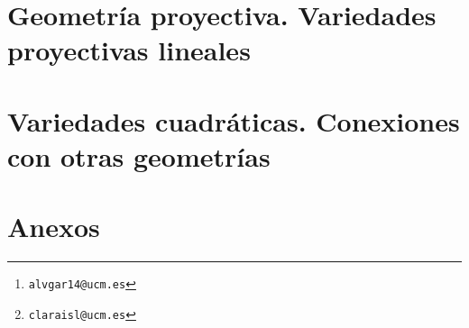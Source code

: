 \documentclass[a4paper, 10pt, twoside, titlepage, openright, onecolumn, final]{book}
\title{\tb{Geometría Lineal}}
\author{Álvaro García Tenorio
	\thanks{\texttt{alvgar14@ucm.es}}\and
	Clara Isabel López González
	\thanks{\texttt{claraisl@ucm.es}}}
\date{\today}
\begin{document}
	\maketitle
	\tableofcontents
	
	\part{Geometría proyectiva. Variedades proyectivas lineales}
	
	
	
	
	
	
	
	\part{Variedades cuadráticas. Conexiones con otras geometrías}
	
	
	\part{Anexos}
	\appendix
	
	\printindex[general]
\end{document}
